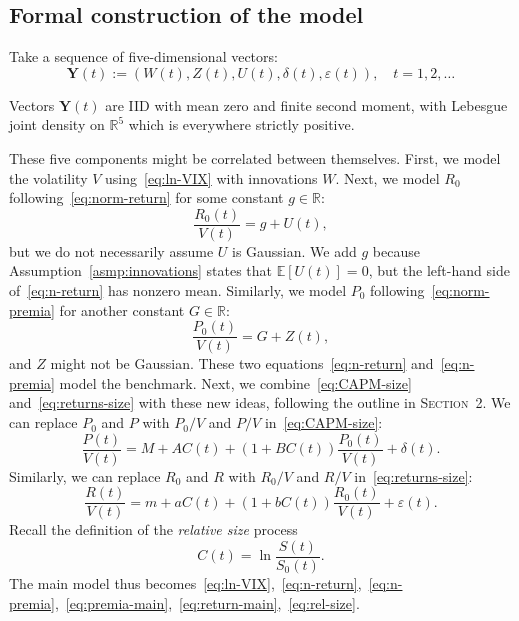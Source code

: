 \documentclass[12pt]{amsart}
\begin{document}
\subsection{Formal construction of the model} Take a sequence of five-dimensional vectors:
\begin{equation}
\label{eq:innovations}
\mathbf{Y}(t) := (W(t), Z(t), U(t), \delta(t), \varepsilon(t)),\quad t = 1, 2, \ldots
\end{equation}

\begin{asmp}
Vectors $\mathbf{Y}(t)$ are IID with mean zero and finite second moment, with Lebesgue joint density on $\mathbb R^5$ which is everywhere strictly positive. 
\label{asmp:innovations}
\end{asmp}

These five components might be correlated between themselves. First, we model the volatility $V$ using~\eqref{eq:ln-VIX} with innovations $W$. Next, we model $R_0$ following~\eqref{eq:norm-return} for some constant $g \in \mathbb R$: 
\begin{equation}
\label{eq:n-return}
\frac{R_0(t)}{V(t)} = g + U(t),
\end{equation}
but we do not necessarily assume $U$ is Gaussian. We add $g$ because Assumption~\ref{asmp:innovations} states that $\mathbb E[U(t)] = 0$, but the left-hand side of~\eqref{eq:n-return} has nonzero mean. Similarly, we model $P_0$ following~\eqref{eq:norm-premia} for another constant $G \in \mathbb R$:
\begin{equation}
\label{eq:n-premia}
\frac{P_0(t)}{V(t)} = G + Z(t),
\end{equation}
and $Z$ might not be Gaussian. These two equations~\eqref{eq:n-return} and~\eqref{eq:n-premia} model the benchmark. Next, we combine~\eqref{eq:CAPM-size} and~\eqref{eq:returns-size} with these new ideas, following the outline in \textsc{Section}~2. We can replace $P_0$ and $P$ with $P_0/V$ and $P/V$ in~\eqref{eq:CAPM-size}:
\begin{equation}
\label{eq:premia-main}
\frac{P(t)}{V(t)} = M + AC(t) + (1 + BC(t))\frac{P_0(t)}{V(t)} + \delta(t).
\end{equation}
Similarly, we can replace $R_0$ and $R$ with $R_0/V$ and $R/V$ in~\eqref{eq:returns-size}:
\begin{equation}
\label{eq:return-main}
\frac{R(t)}{V(t)} = m + aC(t) + (1 + bC(t))\frac{R_0(t)}{V(t)} + \varepsilon(t).
\end{equation}
Recall the definition of the {\it relative size} process 
\begin{equation}
\label{eq:rel-size}
C(t) = \ln\frac{S(t)}{S_0(t)}.
\end{equation} 
The main model thus becomes~\eqref{eq:ln-VIX},~\eqref{eq:n-return},~\eqref{eq:n-premia},~\eqref{eq:premia-main},~\eqref{eq:return-main},~\eqref{eq:rel-size}.
\end{document}
